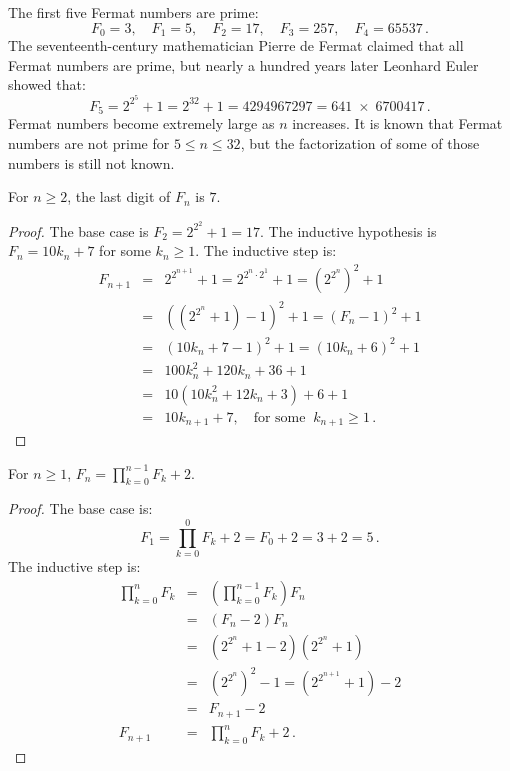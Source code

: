 The first five Fermat numbers are prime:
\[
F_0=3,\quad F_1=5,\quad F_2=17,\quad F_3=257,\quad F_4=65537\,.
\]
The seventeenth-century mathematician Pierre de Fermat claimed that all Fermat numbers are prime, but nearly a hundred years later Leonhard Euler showed that:
\[F_5=2^{2^5}+1 = 2^{32}+1 = 4294967297 = 641 \;\times\; 6700417\,.\]
Fermat numbers become extremely large as $n$ increases. It is known that Fermat numbers are not prime for $5\leq n \leq 32$, but the factorization of some of those numbers is still not known.

\begin{theorem}
For $n\geq 2$, the last digit of $F_n$ is $7$.
\end{theorem}
\begin{proof}
The base case is $F_2=2^{2^2}+1=17$.
The inductive hypothesis is $F_n=10k_n+7$ for some $k_n\geq 1$. The inductive step is:
\begin{eqnarray*}
F_{n+1}&=&2^{2^{n+1}}+1=2^{2^{n}\cdot 2^1}+1=\left(2^{2^{n}}\right)^2+1\\
&=&\left(\left(2^{2^{n}}+1\right)-1\right)^2+1=(F_n-1)^2+1\\
&=&(10k_n+7-1)^2+1=(10k_n+6)^2+1\\
&=&100k_n^2+120k_n+36+1\\
&=&10(10k_n^2+12k_n+3)+6+1\\
&=&10k_{n+1}+7,\quad \textrm{for some} \;\;k_{n+1}\geq 1\,.
\end{eqnarray*}
\end{proof}


\begin{theorem}
For $n\geq 1$, $\displaystyle F_n = \prod_{k=0}^{n-1} F_k + 2$.
\end{theorem}
\begin{proof}
The base case is:
\[
F_1=\prod_{k=0}^{0} F_k + 2=F_0+2=3+2=5\,.
\]
The inductive step is:
\begin{eqnarray*}
\prod_{k=0}^{n}F_k&=&\left(\prod_{k=0}^{n-1}F_k\right) F_n \\
&=& (F_n-2)F_n\\
&=& \left(2^{2^n}+1-2\right)\left(2^{2^n}+1\right)\\
&=& \left(2^{2^{n}}\right)^2-1= \left(2^{2^{n+1}}+1\right)-2\\
&=&F_{n+1}-2\\
F_{n+1}&=&\prod_{k=0}^{n}F_k + 2\,.
\end{eqnarray*}
\end{proof}



